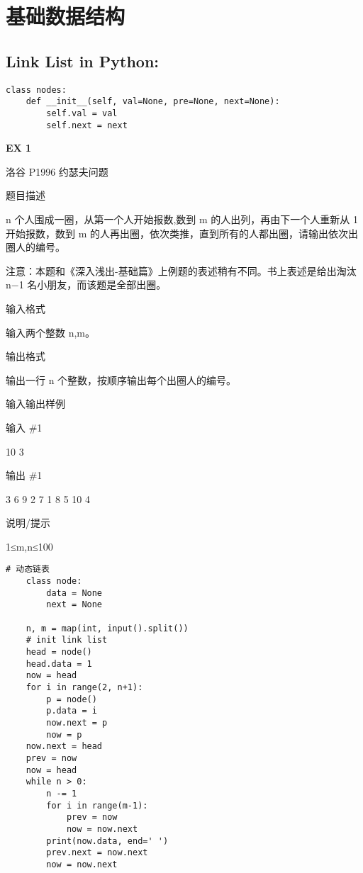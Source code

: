 \documentclass[../main]{subfiles}
\begin{document}
\section{基础数据结构}
    
\subsection{Link List in Python:}

\begin{lstlisting}[style = Python]
class nodes:
    def __init__(self, val=None, pre=None, next=None):
        self.val = val
        self.next = next
\end{lstlisting}

\textbf{EX 1} 


洛谷 P1996 约瑟夫问题

题目描述

n 个人围成一圈，从第一个人开始报数,数到 m 的人出列，再由下一个人重新从 1 开始报数，数到 m 的人再出圈，依次类推，直到所有的人都出圈，请输出依次出圈人的编号。

注意：本题和《深入浅出-基础篇》上例题的表述稍有不同。书上表述是给出淘汰 n−1 名小朋友，而该题是全部出圈。

输入格式

输入两个整数 n,m。

输出格式

输出一行 n 个整数，按顺序输出每个出圈人的编号。

输入输出样例

输入 \#1

10 3

输出 \#1

3 6 9 2 7 1 8 5 10 4

说明/提示

1≤m,n≤100

\begin{lstlisting}[style = Python]
    # 动态链表
    class node:
        data = None
        next = None
    
    n, m = map(int, input().split())
    # init link list
    head = node()
    head.data = 1
    now = head
    for i in range(2, n+1):
        p = node()
        p.data = i
        now.next = p
        now = p
    now.next = head
    prev = now
    now = head
    while n > 0:
        n -= 1
        for i in range(m-1):
            prev = now
            now = now.next
        print(now.data, end=' ')
        prev.next = now.next
        now = now.next
\end{lstlisting}
\end{document}
